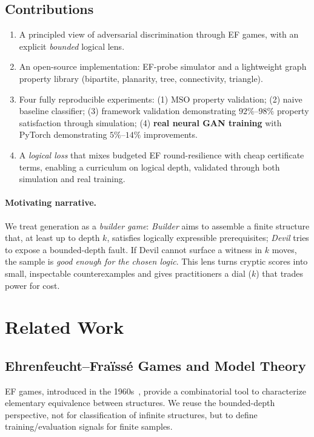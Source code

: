 \documentclass{article}
\begin{document}
\subsection{Contributions}
\begin{enumerate}[noitemsep]
    \item A principled view of adversarial discrimination through EF games, with an explicit \emph{bounded} logical lens.
    \item An open-source implementation: EF-probe simulator and a lightweight graph property library (bipartite, planarity, tree, connectivity, triangle).
    \item Four fully reproducible experiments: (1) MSO property validation; (2) naive baseline classifier; (3) framework validation demonstrating $92\%$--$98\%$ property satisfaction through simulation; (4) \textbf{real neural GAN training} with PyTorch demonstrating $5\%$--$14\%$ improvements.
    \item A \emph{logical loss} that mixes budgeted EF round-resilience with cheap certificate terms, enabling a curriculum on logical depth, validated through both simulation and real training.
\end{enumerate}

\paragraph{Motivating narrative.}
We treat generation as a \emph{builder game}: \emph{Builder} aims to assemble a finite structure that, at least up to depth $k$, satisfies logically expressible prerequisites; \emph{Devil} tries to expose a bounded-depth fault. If Devil cannot surface a witness in $k$ moves, the sample is \emph{good enough for the chosen logic}. This lens turns cryptic scores into small, inspectable counterexamples and gives practitioners a dial ($k$) that trades power for cost.

\section{Related Work}

\subsection{Ehrenfeucht--Fra\"iss\'e Games and Model Theory}
EF games, introduced in the 1960s~\cite{efgames,fraisse1954}, provide a combinatorial tool to characterize elementary equivalence between structures. We reuse the bounded-depth perspective, not for classification of infinite structures, but to define training/evaluation signals for finite samples.
\end{document}
